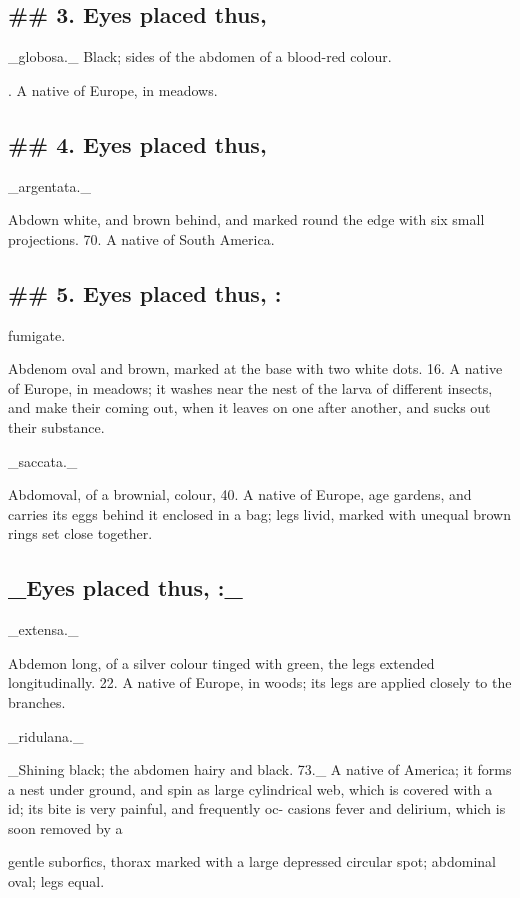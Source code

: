 \subsection*{\#\# 3. Eyes placed thus,}
\_globosa.\_ Black; sides of the abdomen of a blood-red colour.\par{}. A native of Europe, in meadows.\par\medskip
\subsection*{\#\# 4. Eyes placed thus,}
\_argentata.\_\par\medskip
Abdown white, and brown behind, and marked round the edge with six small projections. 70. A native of South America.\par\medskip
\subsection*{\#\# 5. Eyes placed thus, :}
fumigate.\par\medskip
Abdenom oval and brown, marked at the base with two white dots. 16. A native of Europe, in meadows; it washes near the nest of the larva of different insects, and make their coming out, when it leaves on one after another, and sucks out their substance.\par\medskip
\_saccata.\_\par\medskip
Abdomoval, of a brownial, colour, 40. A native of Europe, age gardens, and carries its eggs behind it enclosed in a bag; legs livid, marked with unequal brown rings set close together.\par\medskip
\subsection*{\_Eyes placed thus, :\_}
\_extensa.\_\par\medskip
Abdemon long, of a silver colour tinged with green, the legs extended longitudinally. 22. A native of Europe, in woods; its legs are applied closely to the branches.\par\medskip
\_ridulana.\_\par\medskip
\_Shining black; the abdomen hairy and black. 73.\_ A native of America; it forms a nest under ground, and spin as large cylindrical web, which is covered with a id; its bite is very painful, and frequently oc- casions fever and delirium, which is soon removed by a\par\medskip
gentle suborfics, thorax marked with a large depressed circular spot; abdominal oval; legs equal.\par\medskip
